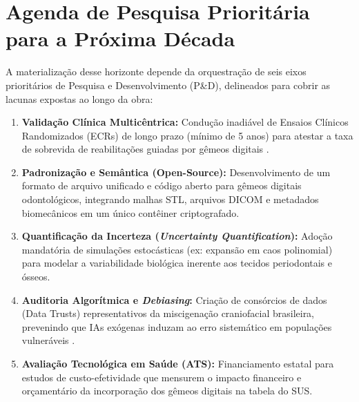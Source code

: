 \section{Agenda de Pesquisa Prioritária para a Próxima Década}

A materialização desse horizonte depende da orquestração de seis eixos prioritários de Pesquisa e Desenvolvimento (P\&D), delineados para cobrir as lacunas expostas ao longo da obra:

\begin{enumerate}
    \item \textbf{Validação Clínica Multicêntrica:} Condução inadiável de Ensaios Clínicos Randomizados (ECRs) de longo prazo (mínimo de 5 anos) para atestar a taxa de sobrevida de reabilitações guiadas por gêmeos digitais \cite{duggal2026exploring}.
    \item \textbf{Padronização e Semântica (Open-Source):} Desenvolvimento de um formato de arquivo unificado e código aberto para gêmeos digitais odontológicos, integrando malhas STL, arquivos DICOM e metadados biomecânicos em um único contêiner criptografado.
    \item \textbf{Quantificação da Incerteza (\textit{Uncertainty Quantification}):} Adoção mandatória de simulações estocásticas (ex: expansão em caos polinomial) para modelar a variabilidade biológica inerente aos tecidos periodontais e ósseos.
    \item \textbf{Auditoria Algorítmica e \textit{Debiasing}:} Criação de consórcios de dados (Data Trusts) representativos da miscigenação craniofacial brasileira, prevenindo que IAs exógenas induzam ao erro sistemático em populações vulneráveis \cite{springer2026realising}.
    \item \textbf{Avaliação Tecnológica em Saúde (ATS):} Financiamento estatal para estudos de custo-efetividade que mensurem o impacto financeiro e orçamentário da incorporação dos gêmeos digitais na tabela do SUS.
\end{enumerate}
